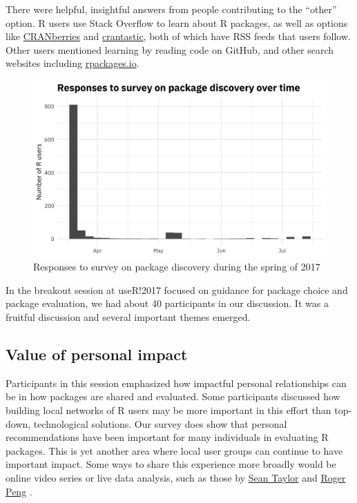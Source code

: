 There were helpful, insightful answers from people contributing to the
``other'' option. R users use Stack Overflow to learn about R packages,
as well as options like
\href{http://dirk.eddelbuettel.com/cranberries/}{CRANberries}
\citep{cranberries} and \href{http://www.crantastic.org/}{crantastic},
both of which have RSS feeds that users follow. Other users mentioned
learning by reading code on GitHub, and other search websites including
\href{http://rpackages.io/}{rpackages.io}.

\begin{figure}
  \centering
  \includegraphics[scale=0.2]{survey_time-1}
  \caption{Responses to survey on package discovery during the spring of 2017}
  \label{figure:survey_time}
\end{figure}

In the breakout session at useR!2017 focused on guidance for package
choice and package evaluation, we had about 40 participants in our
discussion. It was a fruitful discussion and several important themes
emerged.

\hypertarget{value-of-personal-impact}{%
\subsection{Value of personal impact}\label{value-of-personal-impact}}

Participants in this session emphasized how impactful personal
relationships can be in how packages are shared and evaluated. Some
participants discussed how building local networks of R users may be
more important in this effort than top-down, technological solutions.
Our survey does show that personal recommendations have been important
for many individuals in evaluating R packages. This is yet another area
where local user groups can continue to have important impact. Some ways
to share this experience more broadly would be online video series or
live data analysis, such as those by
\href{https://www.facebook.com/seanjtaylor/videos/10103088186201897/}{Sean
Taylor} \citep{taylor} and \href{https://youtu.be/jWePleDwmQo}{Roger
Peng} \citep{peng}.


